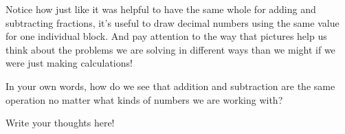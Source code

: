 \documentclass{ximera}
\begin{document}
Notice how just like it was helpful to have the same whole for adding and subtracting fractions, it's useful to draw decimal numbers using the same value for one individual block. And pay attention to the way that pictures help us think about the problems we are solving in different ways than we might if we were just making calculations!


\begin{question}
In your own words, how do we see that addition and subtraction are the same operation no matter what kinds of numbers we are working with?
\begin{freeResponse}
Write your thoughts here!
\end{freeResponse}
\end{question}
\end{document}
